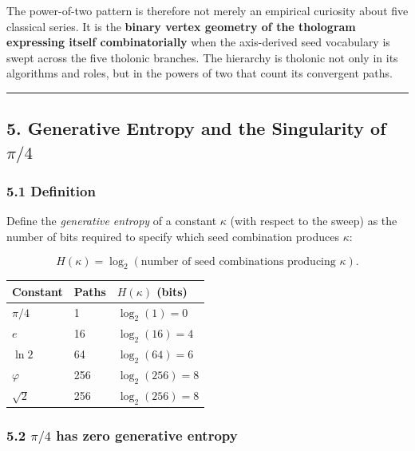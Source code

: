 \documentclass[
  11pt,
  letterpaper,
]{article}
\begin{document}
The power-of-two pattern is therefore not merely an empirical curiosity
about five classical series. It is the \textbf{binary vertex geometry of
the thologram expressing itself combinatorially} when the axis-derived
seed vocabulary is swept across the five tholonic branches. The
hierarchy is tholonic not only in its algorithms and roles, but in the
powers of two that count its convergent paths.

\begin{center}\rule{0.5\linewidth}{0.5pt}\end{center}

\subsection{\texorpdfstring{5. Generative Entropy and the Singularity of
\(\pi/4\)}{5. Generative Entropy and the Singularity of \textbackslash pi/4}}\label{generative-entropy-and-the-singularity-of-pi4}

\subsubsection{5.1 Definition}\label{definition}

Define the \emph{generative entropy} of a constant \(\kappa\) (with
respect to the sweep) as the number of bits required to specify which
seed combination produces \(\kappa\):

\[H(\kappa) = \log_2(\text{number of seed combinations producing } \kappa).
\]

\begin{longtable}[]{@{}lll@{}}
\toprule\noalign{}
Constant & Paths & \(H(\kappa)\) (bits) \\
\midrule\noalign{}
\endhead
\bottomrule\noalign{}
\endlastfoot
\(\pi/4\) & 1 & \(\log_2(1) = 0\) \\
\(e\) & 16 & \(\log_2(16) = 4\) \\
\(\ln 2\) & 64 & \(\log_2(64) = 6\) \\
\(\varphi\) & 256 & \(\log_2(256) = 8\) \\
\(\sqrt{2}\) & 256 & \(\log_2(256) = 8\) \\
\end{longtable}

\subsubsection{\texorpdfstring{5.2 \(\pi/4\) has zero generative
entropy}{5.2 \textbackslash pi/4 has zero generative entropy}}\label{pi4-has-zero-generative-entropy}
\end{document}

